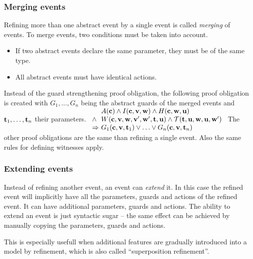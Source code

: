 \subsubsection{Merging events}
\label{merging_events}
Refining more than one abstract event by a single event is called \emph{merging} of events.
To merge events, two conditions must be taken into account.
\begin{itemize}
\item If two abstract events declare the same parameter, they must be of the same type.
\item All abstract events must have identical actions.
\end{itemize}
Instead of the guard strengthening proof obligation, the following proof obligation is
created with $G_1,\ldots,G_n$ being the abstract guards of the merged events
  and $\mathbf{t}_1,\ldots,\mathbf{t}_n$ their parameters.
%
  {$\begin{array}{l@{\ }l}
      & A(\allconstants) \land I(\allconstants,\allvariables) \land
      H(\allconstants,\concvariables,\concparameters) \\ \land &
      W(\allconstants,\allvariables,\absvariables',\concvariables',\allparameters) \land
    \concbeforeafter(\allparameters,\concvariables,\concparameters,\concvariables') \\
    \limp & G_1(\allconstants,\absvariables,\absparameters_1)\lor\ldots\lor G_n(\allconstants,\absvariables,\absparameters_n)      
    \end{array}
$}
The other proof obligations are the same than refining a single event.
Also the same rules for defining witnesses apply.

\subsubsection{Extending events}
\label{extending_events}
Instead of refining another event, an event can \emph{extend} it.
In this case the refined event will implicitly have all the parameters, 
 guards and actions of the refined event. It can have additional parameters,
 guards and actions.
The ability to extend an event is just syntactic sugar -- the same effect
 can be achieved by manually copying the parameters, guards and actions.

This is especially usefull when additional features are gradually introduced
 into a model by refinement, which is also called ``superposition refinement''.

